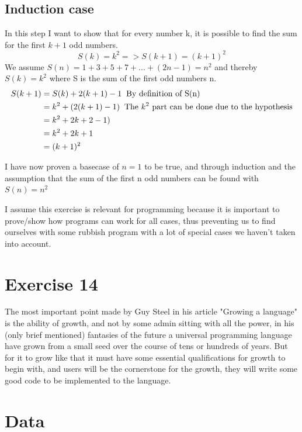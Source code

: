 \documentclass{article}
\begin{document}
\subsection*{Induction case}
In this step I want to show that for every number k, it is possible to find the sum for the first $ k+1 $ odd numbers.\\
    \[ S(k) = k^2 => S(k+1) = (k+1)^2 \]
We assume $ S(n)=1+3+5+7+...+(2n-1)=n^2 $ and thereby $ S(k)=k^2 $ where S is the sum of the first odd numbers n.\\
    \begin{equation*}
        \begin{split}
            S(k+1) &= S(k) + 2(k+1)-1 \text{\: By definition of S(n)} \\
            &= k^2+(2(k+1)-1) \text{\: The $k^2$ part can be done due to the hypothesis} \\
            &= k^2+2k+2-1) \\
            &= k^2+2k+1 \\
            &= (k+1)^2 \\
        \end{split}
    \end{equation*}

    
I have now proven a basecase of $ n=1 $ to be true, and through induction and the assumption that the sum of the first n odd numbers can be found with $ S(n)=n^2 $


I assume this exercise is relevant for programming because it is important to prove/show how programs can work for all cases, thus preventing us to find ourselves with some rubbish program with a lot of special cases we haven't taken into account.

\section*{Exercise 14}
The most important point made by Guy Steel in his article "Growing a language" is the ability of growth, and not by some admin sitting with all the power, in his (only brief mentioned) fantasies of the future a universal programming language have grown from a small seed over the course of tens or hundreds of years. But for it to grow like that it must have some essential qualifications for growth to begin with, and users will be the cornerstone for the growth, they will write some good code to be implemented to the language.

\section*{Data}
\end{document}
